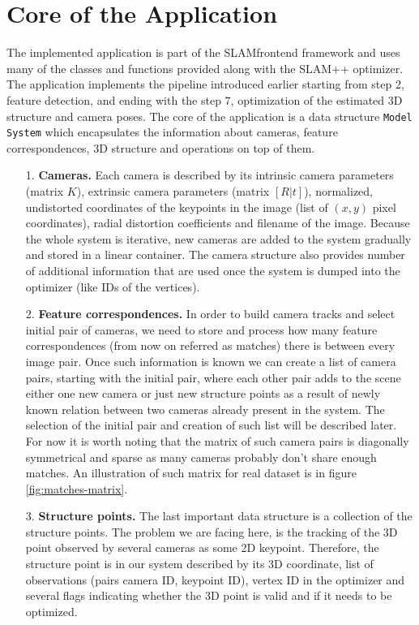 \section{Core of the Application}
\label{sec:implementation-core}
The implemented application is part of the SLAM\textunderscore frontend framework and uses many of the classes and functions provided along with the SLAM++ optimizer. The application implements the pipeline introduced earlier starting from step 2, feature detection, and ending with the step 7, optimization of the estimated 3D structure and camera poses. The core of the application is a data structure \texttt{Model System} which encapsulates the information about cameras, feature correspondences, 3D structure and operations on top of them. 
\begin{itemize}
	\item[1.] \textbf{Cameras.} Each camera is described by its intrinsic camera parameters (matrix $K$), extrinsic camera parameters (matrix $[R|t]$), normalized, undistorted coordinates of the keypoints in the image (list of $(x, y)$ pixel coordinates), radial distortion coefficients and filename of the image. Because the whole system is iterative, new cameras are added to the system gradually and stored in a linear container. The camera structure also provides number of additional information that are used once the system is dumped into the optimizer (like IDs of the vertices).
	\item[2.] \textbf{Feature correspondences.} In order to build camera tracks and select initial pair of cameras, we need to store and process how many feature correspondences (from now on referred as matches) there is between every image pair. Once such information is known we can create a list of camera pairs, starting with the initial pair, where each other pair adds to the scene either one new camera or just new structure points as a result of newly known relation between two cameras already present in the system. The selection of the initial pair and creation of such list will be described later. For now it is worth noting that the matrix of such camera pairs is diagonally symmetrical and sparse as many cameras probably don't share enough matches. An illustration of such matrix for real dataset is in figure \ref{fig:matches-matrix}.
	\item[3.] \textbf{Structure points.} The last important data structure is a collection of the structure points. The problem we are facing here, is the tracking of the 3D point observed by several cameras as some 2D keypoint. Therefore, the structure point is in our system described by its 3D coordinate, list of observations (pairs camera ID, keypoint ID), vertex ID in the optimizer and several flags indicating whether the 3D point is valid and if it needs to be optimized.
\end{itemize}

